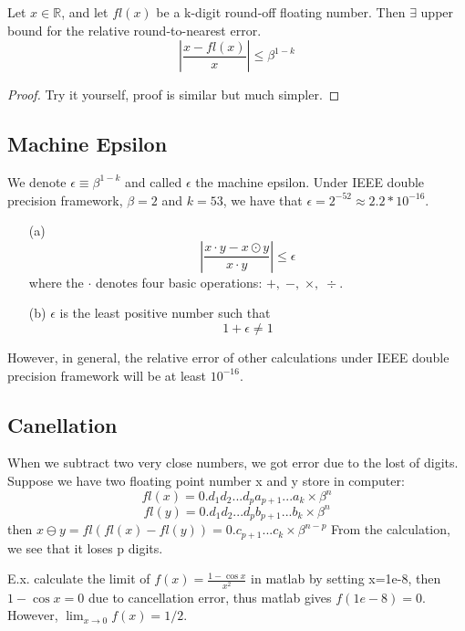 	\begin{upperbound}
		Let $x\in\mathbb{R}$, and let $fl(x)$ be a k-digit round-off floating number. Then $\exists$ upper bound for the relative round-to-nearest error.
		\[\left|\frac{x-fl(x)}{x}\right|\leq \beta^{1-k} \] 
	\end{upperbound}
\begin{proof}
	Try it yourself, proof is similar but much simpler.
\end{proof}
	
	\subsection{Machine Epsilon}
	We denote $\epsilon\equiv\beta^{1-k}$ and called $\epsilon$ the machine epsilon. Under IEEE double precision framework, $\beta=2$ and $k=53$, we have that $\epsilon=2^{-52} \approx 2.2*10^{-16}$.
	
	\begin{property}
		\begin{enumerate}
			\item [(a)]
			\[\left|\frac{x\cdot y - x\odot y}{x\cdot y} \right| \leq \epsilon\]
			where the $\cdot$ denotes four basic operations: $+,\;-,\;\times,\;\div$.
			
			\item [(b)]
			$\epsilon$ is the least positive number such that
			\[ 1+\epsilon \neq 1 \]
		\end{enumerate}
	\end{property}
	
	However, in general, the relative error of other calculations under IEEE double precision framework will be at least $10^{-16}$.

	
	\subsection{Canellation}
	When we subtract two very close numbers, we got error due to the lost of digits.
	Suppose we have two floating point number x and y store in computer:
	\[fl(x) = 0.d_1d_2...d_pa_{p+1}...a_k\times\beta^n\] 
	\[fl(y) = 0.d_1d_2...d_pb_{p+1}...b_k\times\beta^n\]
	then $x\ominus y = fl(fl(x)-fl(y)) = 0.c_{p+1}...c_k\times\beta^{n-p}$
	From the calculation, we see that it loses p digits.
	
	E.x.  calculate the limit of $f(x)= \frac{1-\cos x}{x^2} $  in matlab by setting x=1e-8,
	then $1-\cos x = 0 $ due to cancellation error, thus matlab gives $f(1e-8) = 0$. However, 
	$\lim_{x\rightarrow 0 } f(x) = 1/2 $.   
	
